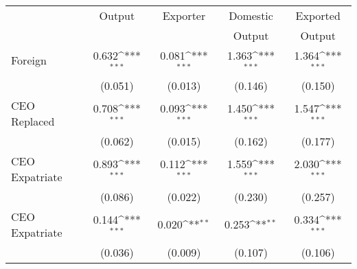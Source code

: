 {
\def\sym#1{\ifmmode^{#1}\else\(^{#1}\)\fi}
\begin{tabular}{l*{4}{c}}
\hline\hline
                    &\multicolumn{1}{c}{Output}&\multicolumn{1}{c}{Exporter}&\multicolumn{1}{c}{Domestic}&\multicolumn{1}{c}{Exported}\\
                    &\multicolumn{1}{c}{} &\multicolumn{1}{c}{} &\multicolumn{1}{c}{Output} &\multicolumn{1}{c}{Output} \\
\hline
Foreign             &       0.632\sym{***}&       0.081\sym{***}&       1.363\sym{***}&       1.364\sym{***}\\
                    &     (0.051)         &     (0.013)         &     (0.146)         &     (0.150)         \\
CEO Replaced        &       0.708\sym{***}&       0.093\sym{***}&       1.450\sym{***}&       1.547\sym{***}\\
                    &     (0.062)         &     (0.015)         &     (0.162)         &     (0.177)         \\
CEO Expatriate      &       0.893\sym{***}&       0.112\sym{***}&       1.559\sym{***}&       2.030\sym{***}\\
                    &     (0.086)         &     (0.022)         &     (0.230)         &     (0.257)         \\ \hline
CEO Expatriate      &       0.144\sym{***}&       0.020\sym{**} &       0.253\sym{**} &       0.334\sym{***}\\
                    &     (0.036)         &     (0.009)         &     (0.107)         &     (0.106)         \\
\hline\hline
\end{tabular}
}
